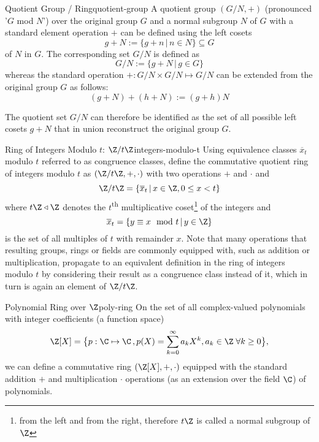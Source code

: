 \begin{definition}{Quotient Group / Ring}{quotient-group}
  A quotient group $(G / N, +)$ (pronounced '$G$ mod $N$') over the original group $G$ and a normal subgroup $N$ of $G$
  with a standard element operation $+$ can be defined using the left cosets
  $$g+N := \{g+n \,|\, n \in N\} \subseteq G$$ of $N$ in $G$.
  The corresponding set $G / N$ is defined as
  $$G / N := \{g + N \,|\, g \in G\}$$
  whereas the standard operation $+: G/N \times G/N \mapsto G/N$
  can be extended from the original group $G$ as follows:
  $$(g+N) + (h+N) := (g+h)N$$
\end{definition}

The quotient set $G / N$ can therefore be identified as the set of all possible left cosets $g + N$ that in union reconstruct the original group $G$.

\begin{definition}{Ring of Integers Modulo $t$: $\Z / t \Z$}{integers-modulo-t}
  Using equivalence classes $\overline{x}_t$ modulo $t$ referred to as congruence classes,
  define the commutative quotient ring of integers modulo $t$ as $(\Z / t \Z, +, \cdot)$ with
  two operations $+$ and $\cdot$ and
  $$\Z / t \Z = \{\overline{x}_t \,|\, x \in \Z, 0 \leq x < t\}$$
  where $t \Z \triangleleft \Z$ denotes the $t$\textsuperscript{th} multiplicative coset\footnote{
    from the left and from the right, therefore $t \Z$ is called a normal subgroup of $\Z$
  } of the integers and
  $$\overline{x}_t = \{y \equiv x \mod t \,|\, y \in \Z\}$$
  is the set of all multiples of $t$ with remainder $x$.
  Note that many operations that resulting groups, rings or fields are commonly equipped with,
  such as addition or multiplication, propagate to an equivalent definition in the ring of integers modulo $t$
  by considering their result as a congruence class instead of it, which in turn is again an element of $\Z / t \Z$.
\end{definition}

\begin{definition}{Polynomial Ring over $\Z$}{poly-ring}
  On the set of all complex-valued polynomials with integer coefficients (a function space)
  $$\Z[X] = \big\{p: \C \mapsto \C \,, p(X) = \sum_{k=0}^\infty a_k X^k, a_k \in \Z \;\forall k \geq 0\big\},$$
  we can define a commutative ring $(\Z[X], +, \cdot)$ equipped with the
  standard addition $+$ and multiplication $\cdot$ operations (as an extension over the field $\C$)
  of polynomials.
\end{definition}

